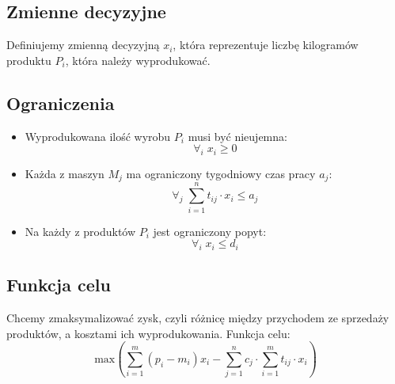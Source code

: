 \documentclass{article}
\begin{document}
\subsection{Zmienne decyzyjne}
Definiujemy zmienną decyzyjną $x_i$, która reprezentuje liczbę kilogramów produktu $P_i$, która należy wyprodukować.
\subsection{Ograniczenia}
\begin{itemize}
\item Wyprodukowana ilość wyrobu $P_i$ musi być nieujemna: 
    \[\forall_{i} \; x_{i} \geq 0\]
    \item Każda z maszyn $M_j$ ma ograniczony tygodniowy czas pracy $a_j$:
    \[\forall_{j} \; \sum_{i=1}^n t_{ij}\cdot x_i \leq a_j\]
    \item Na każdy z produktów $P_i$ jest ograniczony popyt:
    \[\forall_{i} \; x_i \leq d_i\]
\end{itemize}
\subsection{Funkcja celu}
Chcemy zmaksymalizować zysk, czyli różnicę między przychodem ze sprzedaży produktów, a kosztami ich wyprodukowania. Funkcja celu:
\[\text{max} \left( \sum_{i=1}^m (p_i - m_i)x_i - \sum_{j=1}^n c_j\cdot\sum_{i=1}^m t_{ij}\cdot x_i\right)\]
\end{document}
